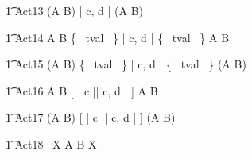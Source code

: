 \begin{circusaction}
        \t1 Act13 \circdef (A \circtimeout {} \rcirctime B) \lpar | \lchanset c, d \rchanset | \rpar (A \circtimeout {} \rcirctime B) \\
\end{circusaction}
        
\begin{circusaction}
        \t1 Act14 \circdef A \circtimeout {} \rcirctime B \lpar \{~ tval ~\} | \lchanset c, d \rchanset | \{~ tval ~\} \rpar A \circtimeout {} \rcirctime B \\
\end{circusaction}

\begin{circusaction}
        \t1 Act15 \circdef (A \circtimeout {} \rcirctime B) \lpar \{~ tval ~\} | \lchanset c, d \rchanset | \{~ tval ~\} \rpar (A \circtimeout {} \rcirctime B) \\
\end{circusaction}
   
\begin{circusaction}
        \t1 Act16 \circdef A \circtimeout {} \rcirctime B [ | \lchanset c \rchanset || \lchanset c, d \rchanset | ] A \circtimeout {} \rcirctime B \\
\end{circusaction}

\begin{circusaction}
        \t1 Act17 \circdef (A \circtimeout {} \rcirctime B) [ | \lchanset c \rchanset || \lchanset c, d \rchanset | ] (A \circtimeout {} \rcirctime B) \\
\end{circusaction}

\begin{circusaction}
	\t1 Act18 \circdef \circmu~X \circspot A \circtimeout {} \rcirctime B \circseq X \\
\end{circusaction}


